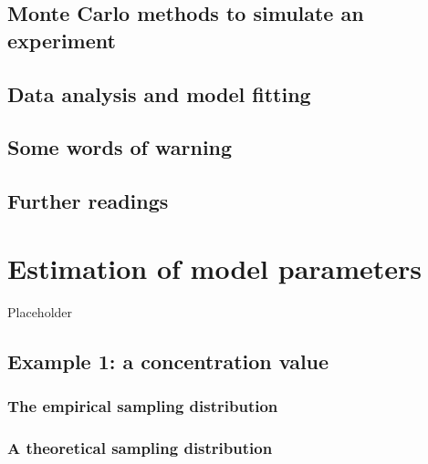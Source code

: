 \documentclass[a4paper,12pt,oneside]{book}
\begin{document}
\hypertarget{monte-carlo-methods-to-simulate-an-experiment}{%
\section{Monte Carlo methods to simulate an experiment}\label{monte-carlo-methods-to-simulate-an-experiment}}

\hypertarget{data-analysis-and-model-fitting}{%
\section{Data analysis and model fitting}\label{data-analysis-and-model-fitting}}

\hypertarget{some-words-of-warning}{%
\section{Some words of warning}\label{some-words-of-warning}}

\hypertarget{further-readings-2}{%
\section{Further readings}\label{further-readings-2}}

\hypertarget{estimation-of-model-parameters}{%
\chapter{Estimation of model parameters}\label{estimation-of-model-parameters}}

Placeholder

\hypertarget{example-1-a-concentration-value}{%
\section{Example 1: a concentration value}\label{example-1-a-concentration-value}}

\hypertarget{the-empirical-sampling-distribution}{%
\subsection{The empirical sampling distribution}\label{the-empirical-sampling-distribution}}

\hypertarget{a-theoretical-sampling-distribution}{%
\subsection{A theoretical sampling distribution}\label{a-theoretical-sampling-distribution}}
\end{document}
